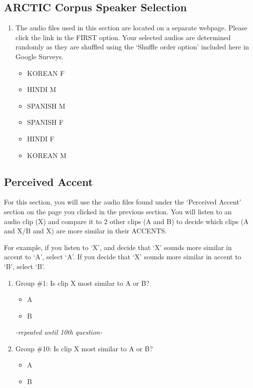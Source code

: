 \documentclass
[
    a4paper,
    twoside,
    12pt,
]
{report}
\begin{document}
\hypertarget{arctic-corpus-speaker-selection}{%
\subsection{ARCTIC Corpus Speaker
Selection}\label{arctic-corpus-speaker-selection}}

\begin{enumerate}
\def\labelenumi{\arabic{enumi}.}
\setcounter{enumi}{1}
\item
  The audio files used in this section are located on a separate
  webpage. Please click the link in the FIRST option. Your selected
  audios are determined randomly as they are shuffled using the `Shuffle
  order option' included here in Google Surveys.

  \begin{itemize}
  \tightlist
  \item
    KOREAN F
  \item
    HINDI M
  \item
    SPANISH M
  \item
    SPANISH F
  \item
    HINDI F
  \item
    KOREAN M
  \end{itemize}
\end{enumerate}

\hypertarget{perceived-accent}{%
\subsection{Perceived Accent}\label{perceived-accent}}

For this section, you will use the audio files found under the
`Perceived Accent' section on the page you clicked in the previous
section. You will listen to an audio clip (X) and compare it to 2 other
clips (A and B) to decide which clips (A and X/B and X) are more similar
in their ACCENTS.

For example, if you listen to `X', and decide that `X' sounds more
similar in accent to `A', select `A'. If you decide that `X' sounds more
similar in accent to `B', select `B'.

\begin{enumerate}
\def\labelenumi{\arabic{enumi}.}
\item
  Group \#1: Is clip X most similar to A or B?

  \begin{itemize}
  \tightlist
  \item
    A
  \item
    B
  \end{itemize}

  \emph{-repeated until 10th question-}
\item
  Group \#10: Is clip X most similar to A or B?

  \begin{itemize}
  \tightlist
  \item
    A
  \item
    B
  \end{itemize}
\end{enumerate}
\end{document}
